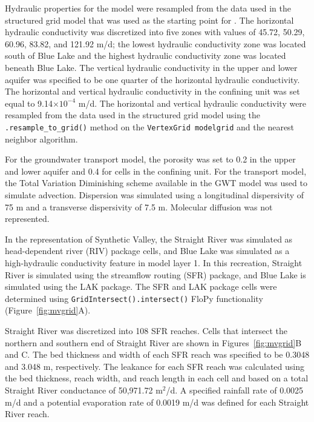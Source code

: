 \documentclass[12pt, oneside]{article}  	%
\begin{document}
Hydraulic properties for the model were resampled from the data used in the structured grid model that was used as the starting point for \cite{hill1998} \citep{pollock2014percomm}. The horizontal hydraulic conductivity was discretized into five zones with values of 45.72, 50.29, 60.96, 83.82, and 121.92 m/d; the lowest hydraulic conductivity zone was located south of Blue Lake and the highest hydraulic conductivity zone was located beneath Blue Lake. The vertical hydraulic conductivity in the upper and lower aquifer was specified to be one quarter of the horizontal hydraulic conductivity. The horizontal and vertical hydraulic conductivity in the confining unit was set equal to 9.14$\times10^{-4}$ m/d. The horizontal and vertical hydraulic conductivity were resampled from the data used in the structured grid model using the \texttt{.resample\_to\_grid()} method on the \texttt{VertexGrid modelgrid} and the nearest neighbor algorithm.

For the groundwater transport model, the porosity was set to 0.2 in the upper and lower aquifer and 0.4 for cells in the confining unit. For the transport model, the Total Variation Diminishing scheme available in the GWT model \citep{modflow6gwt} was used to simulate advection. Dispersion was simulated using a longitudinal dispersivity of 75 m and a transverse dispersivity of 7.5 m. Molecular diffusion was not represented.

In the \cite{hill1998} representation of Synthetic Valley, the Straight River was simulated as head-dependent river (RIV) package cells, and Blue Lake was simulated as a high-hydraulic conductivity feature in model layer 1. In this recreation, Straight River is simulated using the streamflow routing (SFR) package, and Blue Lake is simulated using the LAK package. The SFR and LAK package cells were determined using \texttt{GridIntersect().intersect()} FloPy functionality (Figure~\ref{fig:mvgrid}A). 

Straight River was discretized into 108 SFR reaches. Cells that intersect the northern and southern end of Straight River are shown in Figures~\ref{fig:mvgrid}B and C. The bed thickness and width of each SFR reach was specified to be 0.3048 and 3.048 m, respectively. The leakance for each SFR reach was calculated using the bed thickness, reach width, and reach length in each cell and based on a total Straight River conductance of 50,971.72 m$^2$/d. A specified rainfall rate of 0.0025 m/d and a potential evaporation rate of 0.0019 m/d was defined for each Straight River reach.
\end{document}
